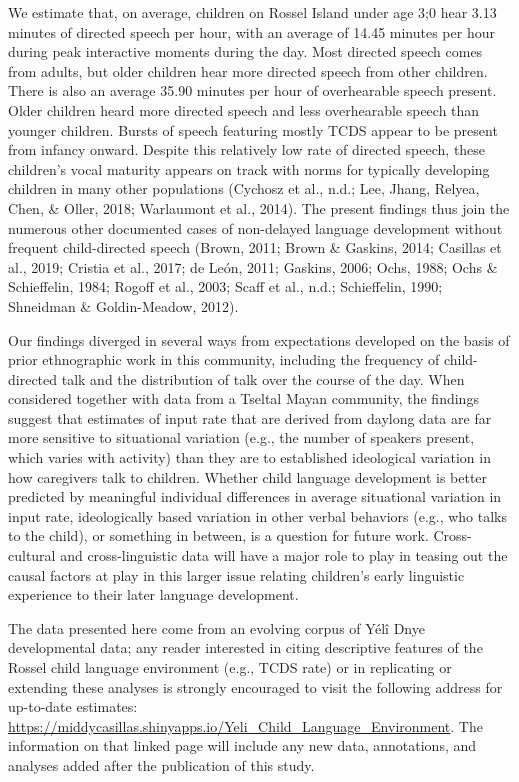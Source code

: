 \documentclass[
  english,
  ,man,floatsintext]{apa6}
\begin{document}
We estimate that, on average, children on Rossel Island under age 3;0 hear 3.13 minutes of directed speech per hour, with an average of 14.45 minutes per hour during peak interactive moments during the day. Most directed speech comes from adults, but older children hear more directed speech from other children. There is also an average 35.90 minutes per hour of overhearable speech present. Older children heard more directed speech and less overhearable speech than younger children. Bursts of speech featuring mostly TCDS appear to be present from infancy onward. Despite this relatively low rate of directed speech, these children's vocal maturity appears on track with norms for typically developing children in many other populations (Cychosz et al., n.d.; Lee, Jhang, Relyea, Chen, \& Oller, 2018; Warlaumont et al., 2014). The present findings thus join the numerous other documented cases of non-delayed language development without frequent child-directed speech (Brown, 2011; Brown \& Gaskins, 2014; Casillas et al., 2019; Cristia et al., 2017; de León, 2011; Gaskins, 2006; Ochs, 1988; Ochs \& Schieffelin, 1984; Rogoff et al., 2003; Scaff et al., n.d.; Schieffelin, 1990; Shneidman \& Goldin-Meadow, 2012).

Our findings diverged in several ways from expectations developed on the basis of prior ethnographic work in this community, including the frequency of child-directed talk and the distribution of talk over the course of the day. When considered together with data from a Tseltal Mayan community, the findings suggest that estimates of input rate that are derived from daylong data are far more sensitive to situational variation (e.g., the number of speakers present, which varies with activity) than they are to established ideological variation in how caregivers talk to children. Whether child language development is better predicted by meaningful individual differences in average situational variation in input rate, ideologically based variation in other verbal behaviors (e.g., who talks to the child), or something in between, is a question for future work. Cross-cultural and cross-linguistic data will have a major role to play in teasing out the causal factors at play in this larger issue relating children's early linguistic experience to their later language development.

The data presented here come from an evolving corpus of Yélî Dnye developmental data; any reader interested in citing descriptive features of the Rossel child language environment (e.g., TCDS rate) or in replicating or extending these analyses is strongly encouraged to visit the following address for up-to-date estimates: \url{https://middycasillas.shinyapps.io/Yeli_Child_Language_Environment}. The information on that linked page will include any new data, annotations, and analyses added after the publication of this study.
\end{document}
